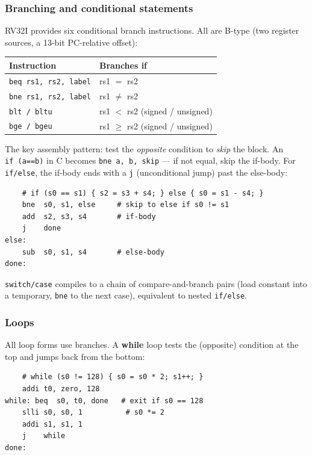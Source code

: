 \documentclass[9pt, a4paper]{extarticle}
\begin{document}
\subsubsection{Branching and conditional statements}

RV32I provides six conditional branch instructions. All are B-type (two register sources, a 13-bit PC-relative offset):

\begin{center}\small
\begin{tabular}{@{}l l@{}}
    \toprule
    Instruction & Branches if \\
    \midrule
    \texttt{beq rs1, rs2, label} & rs1 $=$ rs2 \\
    \texttt{bne rs1, rs2, label} & rs1 $\neq$ rs2 \\
    \texttt{blt / bltu} & rs1 $<$ rs2 (signed / unsigned) \\
    \texttt{bge / bgeu} & rs1 $\geq$ rs2 (signed / unsigned) \\
    \bottomrule
\end{tabular}
\end{center}

The key assembly pattern: test the \emph{opposite} condition to \emph{skip} the block. An \texttt{if~(a==b)} in C becomes \texttt{bne a, b, skip} --- if not equal, skip the if-body. For \texttt{if/else}, the if-body ends with a \texttt{j} (unconditional jump) past the else-body:

\begin{verbatim}
    # if (s0 == s1) { s2 = s3 + s4; } else { s0 = s1 - s4; }
    bne  s0, s1, else     # skip to else if s0 != s1
    add  s2, s3, s4       # if-body
    j    done
else:
    sub  s0, s1, s4       # else-body
done:
\end{verbatim}

\texttt{switch/case} compiles to a chain of compare-and-branch pairs (load constant into a temporary, \texttt{bne} to the next case), equivalent to nested \texttt{if/else}.

\subsubsection{Loops}

All loop forms use branches. A \textbf{while} loop tests the (opposite) condition at the top and jumps back from the bottom:

\begin{verbatim}
    # while (s0 != 128) { s0 = s0 * 2; s1++; }
    addi t0, zero, 128
while: beq  s0, t0, done   # exit if s0 == 128
    slli s0, s0, 1          # s0 *= 2
    addi s1, s1, 1
    j    while
done:
\end{verbatim}
\end{document}
